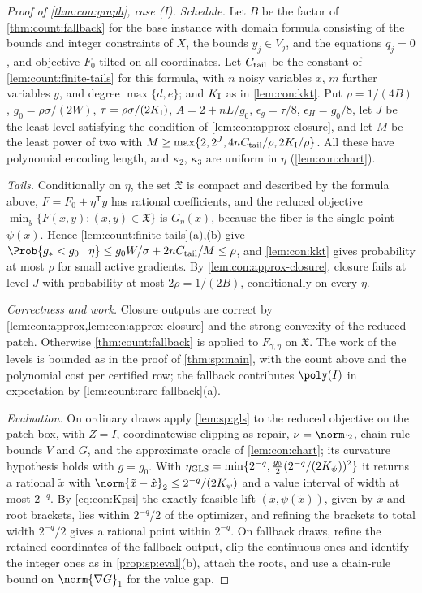 \begin{proof}[Proof of \cref{thm:con:graph}, case (I)]
\emph{Schedule.} Let $B$ be the factor of \cref{thm:count:fallback} for the
base instance with domain formula consisting of the bounds and integer
constraints of $X$, the bounds $y_j\in V_j$, and the equations $q_j=0$, and
objective $F_0$ tilted on all coordinates. Let $C_{\rm tail}$ be the constant
of \cref{lem:count:finite-tails} for this formula, with $n$ noisy variables
$x$, $m$ further variables $y$, and degree $\max\{d,e\}$; and $K_{\rm I}$ as in
\cref{lem:con:kkt}. Put $\rho=1/(4B)$, $g_0=\rho\sigma/(2W)$,
$\tau=\rho\sigma/(2K_{\rm I})$, $A=2+nL/g_0$, $\epsilon_g=\tau/8$,
$\epsilon_H=g_0/8$, let $J$ be the least level satisfying the condition of
\cref{lem:con:approx-closure}, and let $M$ be the least power of two with
$M\ge\max\{2,2^J,4nC_{\rm tail}/\rho,2K_{\rm I}/\rho\}$. All these have
polynomial encoding length, and $\kappa_2$, $\kappa_3$ are uniform in $\eta$
(\cref{lem:con:chart}).

\emph{Tails.} Conditionally on $\eta$, the set $\mathfrak X$ is compact and
described by the formula above, $F=F_0+\eta^{\mathsf T}y$ has rational
coefficients, and the reduced objective $\min_y\{F(x,y):(x,y)\in\mathfrak X\}$
is $G_\eta(x)$, because the fiber is the single point $\psi(x)$. Hence
\cref{lem:count:finite-tails}(a),(b) give
$\Prob\{g_*<g_0\mid\eta\}\le g_0W/\sigma+2nC_{\rm tail}/M\le\rho$, and
\cref{lem:con:kkt} gives probability at most $\rho$ for small active
gradients. By \cref{lem:con:approx-closure}, closure fails at level $J$ with
probability at most $2\rho=1/(2B)$, conditionally on every $\eta$.

\emph{Correctness and work.} Closure outputs are correct by
\cref{lem:con:approx,lem:con:approx-closure} and the strong convexity of the
reduced patch. Otherwise \cref{thm:count:fallback} is applied to
$F_{\gamma,\eta}$ on $\mathfrak X$. The work of the levels is bounded as in the
proof of \cref{thm:sp:main}, with the count above and the polynomial cost per
certified row; the fallback contributes $\poly(I)$ in expectation by
\cref{lem:count:rare-fallback}(a).

\emph{Evaluation.} On ordinary draws apply \cref{lem:sp:gls} to the reduced
objective on the patch box, with $Z=I$, coordinatewise clipping as repair,
$\nu=\norm\cdot_2$, chain-rule bounds $V$ and $G$, and the approximate oracle
of \cref{lem:con:chart}; its curvature hypothesis holds with $g=g_0$. With
$\eta_{\rm GLS}=\min\{2^{-q},\frac{g_0}2(2^{-q}/(2K_\psi))^2\}$ it returns a
rational $\tilde x$ with $\norm{\tilde x-\hat x}_2\le2^{-q}/(2K_\psi)$ and a
value interval of width at most $2^{-q}$. By \eqref{eq:con:Kpsi} the exactly
feasible lift $(\tilde x,\psi(\tilde x))$, given by $\tilde x$ and root
brackets, lies within $2^{-q}/2$ of the optimizer, and refining the brackets to
total width $2^{-q}/2$ gives a rational point within $2^{-q}$. On fallback
draws, refine the retained coordinates of the fallback output, clip the
continuous ones and identify the integer ones as in \cref{prop:sp:eval}(b),
attach the roots, and use a chain-rule bound on
$\norm{\nabla G}_1$ for the value gap.
\end{proof}

